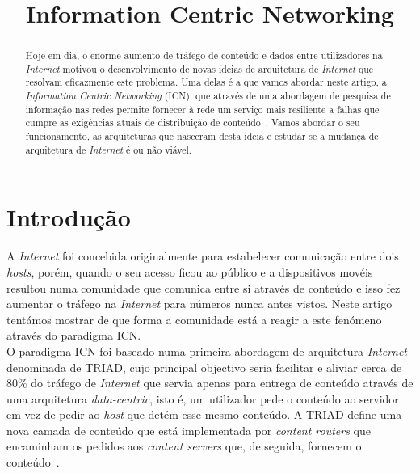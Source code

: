 \documentclass[conference]{IEEEtran}
\begin{document}
\title{Information Centric Networking}

\author{

}

\maketitle

\begin{abstract}
Hoje em dia, o enorme aumento de tr\'{a}fego de conte\'{u}do e dados entre utilizadores na \textit{Internet} motivou o desenvolvimento de novas ideias de arquitetura de \textit{Internet} que resolvam eficazmente este problema. Uma delas \'{e} a que vamos abordar neste artigo, a \textit{Information Centric Networking} (ICN), que atrav\'{e}s de uma abordagem de pesquisa de informa\c{c}\~{a}o nas redes permite fornecer \`{a} rede um servi\c{c}o mais resiliente a falhas que cumpre as exig\^{e}ncias atuais de distribui\c{c}\~{a}o de conte\'{u}do~\cite{ahlgren}. Vamos abordar o seu funcionamento, as arquiteturas que nasceram desta ideia e estudar se a mudan\c{c}a de arquitetura de \textit{Internet} \'{e} ou n\~{a}o vi\'{a}vel. 
\end{abstract}

\section{Introdu\c{c}\~{a}o}


A \textit{Internet} foi concebida originalmente para estabelecer comunicação entre dois \textit{hosts}, porém, quando o seu acesso ficou ao público e a dispositivos movéis resultou numa comunidade que comunica entre si através de conteúdo e isso fez aumentar o tráfego na \textit{Internet} para números nunca antes vistos. Neste artigo tentámos mostrar de que forma a comunidade está a reagir a este fenómeno através do paradigma ICN\cite{cdnToICN}.\\

O paradigma ICN foi baseado numa primeira abordagem de arquitetura \textit{Internet} denominada de TRIAD\cite{triad}, cujo principal objectivo seria facilitar e aliviar cerca de 80\% do tr\'{a}fego de \textit{Internet} que servia apenas para entrega de conte\'{u}do atrav\'{e}s de uma arquitetura \textit{data-centric}, isto \'{e}, um utilizador pede o conte\'{u}do ao servidor em vez de pedir ao \textit{host} que det\'{e}m esse mesmo conte\'{u}do\cite{ahlgren}. A TRIAD define uma nova camada de conte\'{u}do que est\'{a} implementada por \textit{content routers} que encaminham os pedidos aos \textit{content servers} que, de seguida, fornecem o conte\'{u}do~.\\
\end{document}
